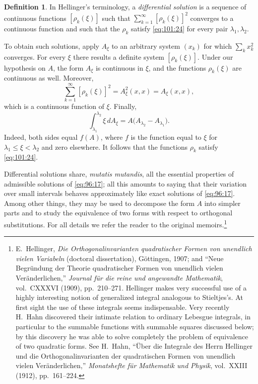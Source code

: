 \documentclass[
  paper=b5,
  fontsize=13pt,
  twoside=true,
  open=any,
  bookmarkpackage=false,
  chapterprefix=true,
  headings=normal
]{scrbook}
\theoremstyle{definition}
\newtheorem*{definition}{Definition}
\begin{document}
\begin{definition}
In Hellinger's terminology, a \emph{differential solution} is a sequence of
continuous functions \([\rho_k(\xi)]\) such that
\(\sum_{k=1}^{\infty}[\rho_k(\xi)]^2\) converges to a continuous function and
such that the \(\rho_k\) satisfy \eqref{eq:101:24} for every pair
\(\lambda_1,\lambda_2\).
\end{definition}

To obtain such solutions, apply \(A_\xi\) to an arbitrary system \((x_k)\)
for which \(\sum_kx_k^2\) converges.  For every \(\xi\) there results a
definite system \([\rho_k(\xi)]\).  Under our hypothesis on \(A\), the form
\(A_\xi\) is continuous in \(\xi\), and the functions \(\rho_k(\xi)\) are
continuous as well.  Moreover,
\[
  \sum_{k=1}^{\infty}[\rho_k(\xi)]^2
  =A_\xi^2(x,x)=A_\xi(x,x),
\]
which is a continuous function of \(\xi\).  Finally,
\[
  \int_{\lambda_1}^{\lambda_2}\xi\,dA_\xi
  =A\bigl(A_{\lambda_2}-A_{\lambda_1}\bigr).
\]
Indeed, both sides equal \(f(A)\), where \(f\) is the function equal to
\(\xi\) for \(\lambda_1\le\xi<\lambda_2\) and zero elsewhere.  It follows
that the functions \(\rho_k\) satisfy \eqref{eq:101:24}.

Differential solutions share, \emph{mutatis mutandis}, all the essential
properties of admissible solutions of
\eqref{eq:96:17}; all this amounts to saying that their variation over small
intervals behaves approximately like exact solutions of
\eqref{eq:96:17}.  Among other things, they may be used to decompose the form
\(A\) into simpler parts and to study the equivalence of two forms with
respect to orthogonal substitutions.  For all details we refer the reader to
the original memoirs.\footnote{E.~Hellinger, \emph{Die Orthogonalinvarianten
quadratischer Formen von unendlich vielen Variabeln} (doctoral dissertation),
Göttingen, 1907; and ``Neue Begründung der Theorie quadratischer Formen von
unendlich vielen Veränderlichen,'' \emph{Journal für die reine und angewandte
Mathematik}, vol.~CXXXVI (1909), pp.~210--271.  Hellinger makes very successful
use of a highly interesting notion of generalized integral analogous to
Stieltjes's.  At first sight the use of these integrals seems indispensable.
Very recently H.~Hahn discovered their intimate relation to ordinary
Lebesgue integrals, in particular to the summable functions with summable
squares discussed below; by this discovery he was able to solve completely
the problem of equivalence of two quadratic forms.  See H.~Hahn, ``Über die
Integrale des Herrn Hellinger und die Orthogonalinvarianten der quadratischen
Formen von unendlich vielen Veränderlichen,'' \emph{Monatshefte für Mathematik
und Physik}, vol.~XXIII (1912), pp.~161--224.}
\end{document}
